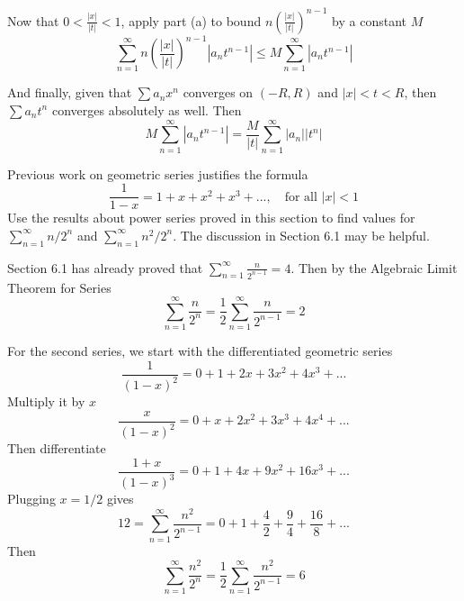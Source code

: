 \documentclass{oxmathproblems}
\begin{document}
\begin{questions}
\begin{solution}
\begin{enumerate}
    Now that $0 < \frac{|x|}{|t|} < 1$, apply part (a) to bound  $n\left(\frac{|x|}{|t|}\right)^{n-1}$ by a constant $M$
    \[\sum_{n=1}^{\infty} n\left(\frac{|x|}{|t|}\right)^{n-1} |a_{n}t^{n-1}| \leq M \sum_{n=1}^{\infty} |a_{n}t^{n-1}|\]

    And finally, given that $\sum a_{n}x^{n}$ converges on $(-R, R)$ and $|x| < t < R$, then $\sum a_{n}t^{n}$ converges absolutely as well. Then
    \[ M \sum_{n=1}^{\infty} |a_{n}t^{n-1}| =  \frac{M}{|t|}\sum_{n=1}^{\infty} |a_{n}||t^{n}|\]
  \end{enumerate}
\end{solution}

\miquestion Previous work on geometric series justifies the formula
\[\frac{1}{1-x} = 1 + x + x^2 + x^3 + ..., \quad  \text{for all } |x| < 1\]
Use the results about power series proved in this section to find values for $\sum_{n=1}^{\infty}n/2^{n}$ and $\sum_{n=1}^{\infty}n^{2}/2^{n}$.
The discussion in Section 6.1 may be helpful.

\begin{solution}
  Section 6.1 has already proved that $\sum_{n=1}^{\infty}\frac{n}{2^{n-1}}=4$. Then by the Algebraic Limit Theorem for Series
  \[\sum_{n=1}^{\infty}\frac{n}{2^{n}}=\frac{1}{2}\sum_{n=1}^{\infty}\frac{n}{2^{n-1}} = 2\]

  For the second series, we start with the differentiated geometric series
  \[\frac{1}{(1-x)^2} = 0 + 1 + 2x + 3x^2 + 4x^3 + ...\]
  Multiply it by $x$
  \[\frac{x}{(1-x)^2} = 0 + x + 2x^2 + 3x^3 + 4x^4 + ...\]
  Then differentiate
  \[\frac{1+x}{(1-x)^3} = 0 + 1 + 4x + 9x^2 + 16x^3 + ...\]
  Plugging $x=1/2$ gives
  \[12 = \sum_{n=1}^{\infty} \frac{n^2}{2^{n-1}} = 0 + 1 + \frac{4}{2} + \frac{9}{4} + \frac{16}{8} + ...\]
  Then
  \[\sum_{n=1}^{\infty}\frac{n^2}{2^{n}}=\frac{1}{2}\sum_{n=1}^{\infty}\frac{n^2}{2^{n-1}} = 6\]
\end{solution}

\end{questions}
\end{document}
